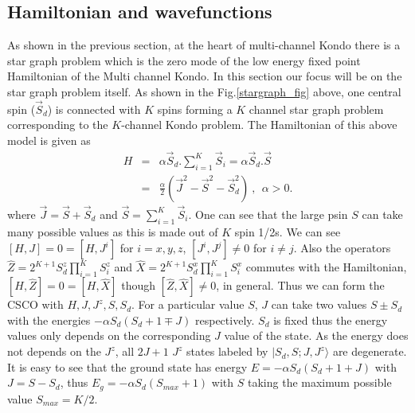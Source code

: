 \documentclass[reprint,prb,superscriptaddress]{revtex4-2}
\begin{document}
\subsection{Hamiltonian and wavefunctions}
\noindent As shown in the previous section, at the heart of multi-channel Kondo there is a star graph problem which is the zero mode of the low energy fixed point Hamiltonian of the Multi channel Kondo. In this section our focus will be on the star graph problem itself.
As shown in the Fig.\ref{stargraph_fig} above, one central spin ($\vec{S}_d$) is connected with $K$ spins forming a $K$ channel star graph problem corresponding to the $K$-channel Kondo problem. The Hamiltonian of this above model is given as 
\begin{eqnarray}
H &=& \alpha \vec{S}_d.\sum_{i=1}^{K}\vec{S}_i=\alpha \vec{S}_d.\vec{S} \nonumber\\
&=& \frac{\alpha}{2} (\vec{J}^2-\vec{S}^2-\vec{S}_d^2)~,~~\alpha >0.
\end{eqnarray}
where $\vec{J}=\vec{S}+\vec{S}_d$ and $\vec{S}=\sum_{i=1}^{K} \vec{S}_i$. One can see that the large psin $S$ can take many possible values as this is made out of $K$ spin 1/2s. We can see $[H,J]=0=[H,J^i]$ for  $i=x,y,z$, $[J^i,J^j]\neq 0$ for $i\neq j$. Also the operators $\hat{Z}=2^{K+1}S_d^z\prod_{i=1}^{K} S_i^z $ and $\hat{X}=2^{K+1}S_d^x\prod_{i=1}^{K} S_i^x $ commutes with the Hamiltonian, $[H,\hat{Z}]=0=[H,\hat{X}]$ though $[\hat{Z},\hat{X}]\neq 0$, in general.
 Thus we can form the CSCO with $H,J,J^z,S,S_d$. For a particular value $S$, $J$ can take two values $S\pm S_d$ with the energies $-\alpha S_d(S_d+1\mp J)$ respectively. $S_d$ is fixed thus the energy values only depends on the corresponding $J$ value of the state. As the energy does not depends on the $J^z$, all $2J+1$ $J^z$ states labeled by $|S_d,S;J,J^z\rangle$ are degenerate. It is easy to see that the ground state has energy $E=-\alpha S_d(S_d+1+J)$ with  $J=S-S_d$, thus $E_g=-\alpha S_d(S_{max}+1)$ with $S$ taking the maximum possible value $S_{max}=K/2$.
\end{document}
